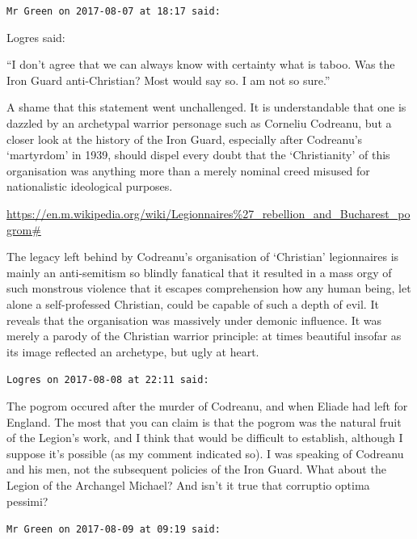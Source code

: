 \begin{footnotesize}
\begin{sffamily}
\hfill

\texttt{Mr Green on 2017-08-07 at 18:17 said:}

Logres said:

``I don't agree that we can always know with certainty what is taboo. Was the Iron Guard anti-Christian? Most would say so. I am not so sure.''

A shame that this statement went unchallenged. It is understandable that one is dazzled by an archetypal warrior personage such as Corneliu Codreanu, but a closer look at the history of the Iron Guard, especially after Codreanu's `martyrdom' in 1939, should dispel every doubt that the `Christianity' of this organisation was anything more than a merely nominal creed misused for nationalistic ideological purposes.

\url{https://en.m.wikipedia.org/wiki/Legionnaires\%27\_rebellion\_and\_Bucharest\_pogrom\#}


The legacy left behind by Codreanu's organisation of `Christian' legionnaires is mainly an anti-semitism so blindly fanatical that it resulted in a mass orgy of such monstrous violence that it escapes comprehension how any human being, let alone a self-professed Christian, could be capable of such a depth of evil. It reveals that the organisation was massively under demonic influence. It was merely a parody of the Christian warrior principle: at times beautiful insofar as its image reflected an archetype, but ugly at heart.

\hfill

\texttt{Logres on 2017-08-08 at 22:11 said:}

The pogrom occured after the murder of Codreanu, and when Eliade had left for England. The most that you can claim is that the pogrom was the natural fruit of the Legion's work, and I think that would be difficult to establish, although I suppose it's possible (as my comment indicated so). I was speaking of Codreanu and his men, not the subsequent policies of the Iron Guard. What about the Legion of the Archangel Michael? And isn't it true that corruptio optima pessimi?

\hfill

\texttt{Mr Green on 2017-08-09 at 09:19 said:}


\end{sffamily}
\end{footnotesize}
